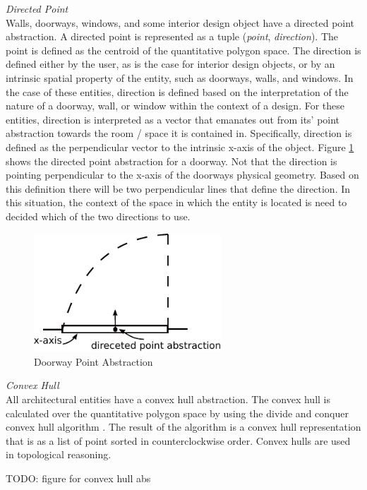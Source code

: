 \documentclass[12pt]{ucthesis}
\begin{document}
\noindent \emph{\large Directed Point} \\
\indent Walls, doorways, windows, and some interior design object have a directed point abstraction. A directed point is represented as a tuple (\emph{point}, \emph{direction}). The point is defined as the centroid of the quantitative polygon space. The direction is defined either by the user, as is the case for interior design objects, or by an intrinsic spatial property of the entity, such as doorways, walls, and windows. In the case of these entities, direction is defined based on the interpretation of the nature of a doorway, wall, or window within the context of a design. For these entities, direction is interpreted as a vector that emanates out from its' point abstraction towards the room / space it is contained in. Specifically, direction is defined as the perpendicular vector to the intrinsic x-axis of the object. Figure \ref{dir-point-abs} shows the directed point abstraction for a doorway. Not that the direction is pointing perpendicular to the x-axis of the doorways physical geometry. Based on this definition there will be two perpendicular lines that define the direction. In this situation, the context of the space in which the entity is located is need to decided which of the two directions to use.  

\begin{figure}[H]\label{dir-point-abs}
\centering
\includegraphics[width=70mm]{dir-point-abs}
\caption{Doorway Point Abstraction}
\end{figure}

\noindent \emph{\large Convex Hull} \\
\indent All architectural entities have a convex hull abstraction. The convex hull is calculated over the quantitative polygon space by using the divide and conquer convex hull algorithm \cite{tbd}. The result of the algorithm is a convex hull representation that is as a list of point sorted in counterclockwise order. Convex hulls are used in topological reasoning.

TODO: figure for convex hull abs
\end{document}
